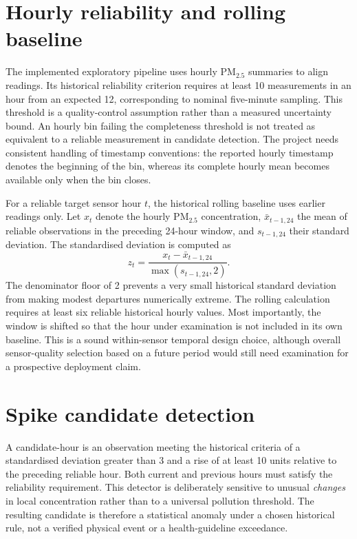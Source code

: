 \documentclass[12pt,a4paper,oneside]{report}
\begin{document}
\section{Hourly reliability and rolling baseline}
The implemented exploratory pipeline uses hourly PM$_{2.5}$ summaries to align readings. Its historical reliability criterion requires at least 10 measurements in an hour from an expected 12, corresponding to nominal five-minute sampling. This threshold is a quality-control assumption rather than a measured uncertainty bound. An hourly bin failing the completeness threshold is not treated as equivalent to a reliable measurement in candidate detection. The project needs consistent handling of timestamp conventions: the reported hourly timestamp denotes the beginning of the bin, whereas its complete hourly mean becomes available only when the bin closes.

For a reliable target sensor hour $t$, the historical rolling baseline uses earlier readings only. Let $x_t$ denote the hourly PM$_{2.5}$ concentration, $\bar{x}_{t-1,24}$ the mean of reliable observations in the preceding 24-hour window, and $s_{t-1,24}$ their standard deviation. The standardised deviation is computed as
\begin{equation}\label{eq:zscore}
z_t=\frac{x_t-\bar{x}_{t-1,24}}{\max(s_{t-1,24},2)}.
\end{equation}
The denominator floor of 2 prevents a very small historical standard deviation from making modest departures numerically extreme. The rolling calculation requires at least six reliable historical hourly values. Most importantly, the window is shifted so that the hour under examination is not included in its own baseline. This is a sound within-sensor temporal design choice, although overall sensor-quality selection based on a future period would still need examination for a prospective deployment claim.

\section{Spike candidate detection}
A candidate-hour is an observation meeting the historical criteria of a standardised deviation greater than 3 and a rise of at least 10 units relative to the preceding reliable hour. Both current and previous hours must satisfy the reliability requirement. This detector is deliberately sensitive to unusual \emph{changes} in local concentration rather than to a universal pollution threshold. The resulting candidate is therefore a statistical anomaly under a chosen historical rule, not a verified physical event or a health-guideline exceedance.
\end{document}
